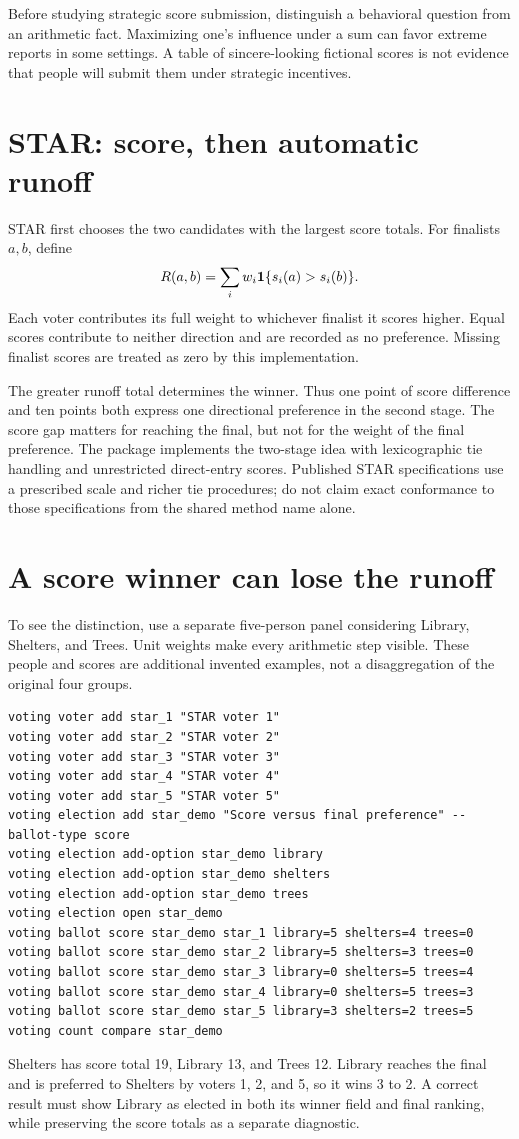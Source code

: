 Before studying strategic score submission, distinguish a behavioral question from an arithmetic fact. Maximizing one's influence under a sum can favor extreme reports in some settings. A table of sincere-looking fictional scores is not evidence that people will submit them under strategic incentives.

\section{STAR: score, then automatic runoff}
STAR first chooses the two candidates with the largest score totals. For finalists $a,b$, define
\[
R(a,b)=\sum_i w_i\mathbf{1}\{s_i(a)>s_i(b)\}.
\]
Each voter contributes its full weight to whichever finalist it scores higher. Equal scores contribute to neither direction and are recorded as no preference. Missing finalist scores are treated as zero by this implementation.

The greater runoff total determines the winner. Thus one point of score difference and ten points both express one directional preference in the second stage. The score gap matters for reaching the final, but not for the weight of the final preference.
The package implements the two-stage idea with lexicographic tie handling and unrestricted direct-entry scores. Published STAR specifications use a prescribed scale and richer tie procedures; do not claim exact conformance to those specifications from the shared method name alone.\cite{star}

\section{A score winner can lose the runoff}
To see the distinction, use a separate five-person panel considering Library, Shelters, and Trees. Unit weights make every arithmetic step visible. These people and scores are additional invented examples, not a disaggregation of the original four groups.
\begin{lstlisting}[style=votingrun]
voting voter add star_1 "STAR voter 1"
voting voter add star_2 "STAR voter 2"
voting voter add star_3 "STAR voter 3"
voting voter add star_4 "STAR voter 4"
voting voter add star_5 "STAR voter 5"
voting election add star_demo "Score versus final preference" --ballot-type score
voting election add-option star_demo library
voting election add-option star_demo shelters
voting election add-option star_demo trees
voting election open star_demo
voting ballot score star_demo star_1 library=5 shelters=4 trees=0
voting ballot score star_demo star_2 library=5 shelters=3 trees=0
voting ballot score star_demo star_3 library=0 shelters=5 trees=4
voting ballot score star_demo star_4 library=0 shelters=5 trees=3
voting ballot score star_demo star_5 library=3 shelters=2 trees=5
voting count compare star_demo
\end{lstlisting}
Shelters has score total 19, Library 13, and Trees 12. Library reaches the final and is preferred to Shelters by voters 1, 2, and 5, so it wins 3 to 2. A correct result must show Library as elected in both its winner field and final ranking, while preserving the score totals as a separate diagnostic.


